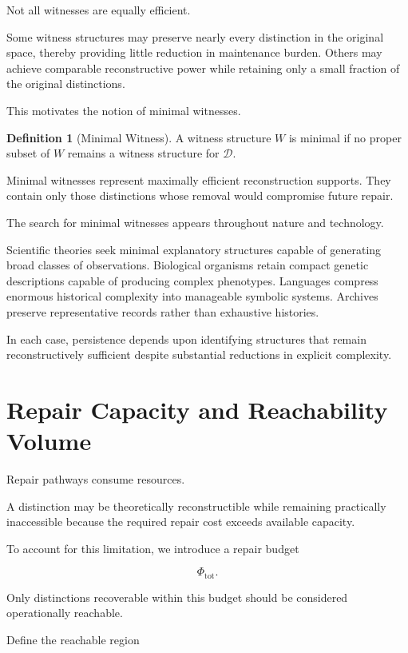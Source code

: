 \documentclass[12pt,oneside]{book}
\theoremstyle{plain} \newtheorem{theorem}{Theorem}[chapter] \newtheorem{lemma}[theorem]{Lemma} \newtheorem{proposition}[theorem]{Proposition} \newtheorem{corollary}[theorem]{Corollary}
\theoremstyle{definition} \newtheorem{definition}[theorem]{Definition} \newtheorem{axiom}[theorem]{Axiom} \newtheorem{construction}[theorem]{Construction}
\theoremstyle{remark} \newtheorem{remark}[theorem]{Remark} \newtheorem{example}[theorem]{Example}
\newcommand{\D}{\mathcal{D}} \newcommand{\R}{\mathcal{R}} \newcommand{\F}{\mathcal{F}} \newcommand{\U}{\mathcal{U}} \newcommand{\M}{\mathcal{M}} \newcommand{\G}{\Gamma}
\begin{document}
Not all witnesses are equally efficient.

Some witness structures may preserve nearly every distinction in the original space, thereby providing little reduction in maintenance burden. Others may achieve comparable reconstructive power while retaining only a small fraction of the original distinctions.

This motivates the notion of minimal witnesses.

\begin{definition}[Minimal Witness]

A witness structure $W$ is minimal if no proper subset of $W$ remains a witness structure for $\D$.

\end{definition}

Minimal witnesses represent maximally efficient reconstruction supports. They contain only those distinctions whose removal would compromise future repair.

The search for minimal witnesses appears throughout nature and technology.

Scientific theories seek minimal explanatory structures capable of generating broad classes of observations. Biological organisms retain compact genetic descriptions capable of producing complex phenotypes. Languages compress enormous historical complexity into manageable symbolic systems. Archives preserve representative records rather than exhaustive histories.

In each case, persistence depends upon identifying structures that remain reconstructively sufficient despite substantial reductions in explicit complexity.

\section{Repair Capacity and Reachability Volume}

Repair pathways consume resources.

A distinction may be theoretically reconstructible while remaining practically inaccessible because the required repair cost exceeds available capacity.

To account for this limitation, we introduce a repair budget

\[
\Phi_{\mathrm{tot}}.
\]

Only distinctions recoverable within this budget should be considered operationally reachable.

Define the reachable region
\end{document}
